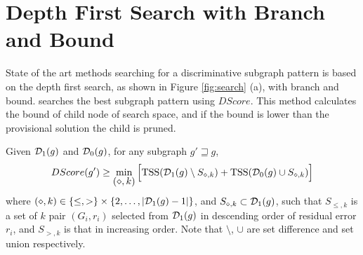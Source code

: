 \section{Depth First Search with Branch and Bound}
State of the art methods \cite{Saigo:2009, Shirakawa:2018} 
searching for a discriminative subgraph pattern is 
based on the depth first search, as shown in Figure \ref{fig:search} (a), with branch and bound.
\cite{Shirakawa:2018} searches the best subgraph pattern using $DScore$. 
This method calculates the bound of child node of search space, 
and if the bound is lower than the provisional solution the child is pruned.
\begin{comment}
\begin{theorem}
  \label{thm:bound_C}
  Given $\D_1(g)$ and $\D_0(g)$, for any subgraph $g' \sqsupseteq g$,
  \begin{multline}
    \label{eq:bound_C}
    CScore(g') \leq 
    \max \Big[ 2 \sum_{\{n | y_n=+1, \{G_{n}, y_{n}\} \in D_1(g)\}} y_n - \sum_{n=1}^{N}y_n, 
	-2 \sum_{\{n | y_n=-1, \{G_{n}, y_{n}\} \in D_1(g)\}} y_n + \sum_{n=1}^{N}y_n \Big]
  \end{multline}
\end{theorem}
\end{comment}

\begin{theorem}
  \label{thm:bound_R}
  Given $\mathcal{D}_1(g)$ and $\mathcal{D}_0(g)$, for any subgraph $g' \sqsupseteq g$,
  \begin{multline}
    \label{eq:bound_R}
    DScore(g') \geq 
    \mymin{(\diamond,k)} \Big[ \tss(\D_1(g) \setminus S_{\diamond, k}) + \tss(\D_0(g) \cup S_{\diamond, k}) \Big]
  \end{multline}
  where $ (\diamond, k) \in \{ \leq, > \} \times \{ 2, \dots, |\mathcal{D}_1(g) - 1| \} $,
  and $S_{\diamond, k} \subset \mathcal{D}_1(g)$, such that $S_{\leq, k}$ is
  a set of $k$ pair $(G_i, r_i)$ selected from $\mathcal{D}_1(g)$ in descending order of residual error $r_i$,
  and $S_{>, k}$ is that in increasing order.
  Note that $\setminus$, $\cup$ are set difference and set union respectively.
\end{theorem}

